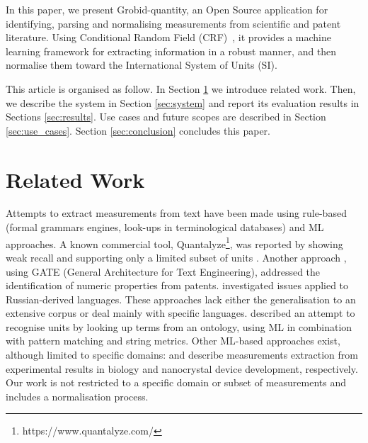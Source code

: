 \documentclass[sigconf]{acmart}
\begin{document}
In this paper, we present Grobid-quantity, an Open Source application \cite{grobid-quantities} for identifying, parsing and normalising measurements from scientific and patent literature. Using Conditional Random Field (CRF)~\cite{lafferty2001conditional}, it provides a machine learning framework for extracting information in a robust manner, and then normalise them toward the International System of Units (SI). 

This article is organised as follow. In Section \ref{sec:related_work} we introduce related work. Then, we describe the system in Section \ref{sec:system} and report its evaluation results in Sections \ref{sec:results}. Use cases and future scopes are described in Section \ref{sec:use_cases}. Section \ref{sec:conclusion} concludes this paper.

\section{Related Work}
\label{sec:related_work}
Attempts to extract measurements from text have been made using rule-based (formal grammars engines, look-ups in terminological databases) and ML approaches. A known commercial tool, Quantalyze\footnote{https://www.quantalyze.com/}, was reported by \cite{hundman2017measurement} showing weak recall and supporting only a limited subset of units \cite{aras2014applications}. Another approach \cite{agatonovic2008large}, using GATE (General Architecture for Text Engineering), addressed the identification of numeric properties from patents. \cite{am2013processing} investigated issues applied to Russian-derived languages. These approaches lack either the generalisation to an extensive corpus or deal mainly with specific languages. \cite{berrahou2013extract} described an attempt to recognise units by looking up terms from an ontology, using ML in combination with pattern matching and string metrics. Other ML-based approaches exist, although limited to specific domains: \cite{kang_extracting_2013} and \cite{dieb2015framework} describe measurements extraction from experimental results in biology and nanocrystal device development, respectively. Our work is not restricted to a specific domain or subset of measurements and includes a normalisation process. 
\end{document}
